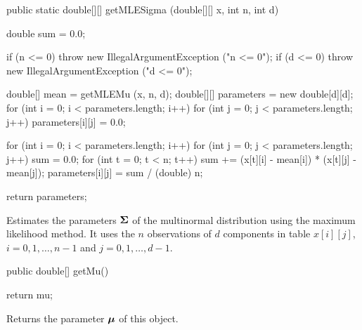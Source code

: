 \begin{htmlonly}
\end{htmlonly}
\begin{code}

   public static double[][] getMLESigma (double[][] x, int n, int d)\begin{hide} {
      double sum = 0.0;

      if (n <= 0)
         throw new IllegalArgumentException ("n <= 0");
      if (d <= 0)
         throw new IllegalArgumentException ("d <= 0");

      double[] mean = getMLEMu (x, n, d);
      double[][] parameters = new double[d][d];
      for (int i = 0; i < parameters.length; i++)
         for (int j = 0; j < parameters.length; j++)
            parameters[i][j] = 0.0;

      for (int i = 0; i < parameters.length; i++)
      {
         for (int j = 0; j < parameters.length; j++)
         {
            sum = 0.0;
            for (int t = 0; t < n; t++)
               sum += (x[t][i] - mean[i]) * (x[t][j] - mean[j]);
            parameters[i][j] = sum / (double) n;
         }
      }

      return parameters;
   }\end{hide}
\end{code}
\begin{tabb}
   Estimates the parameters $\boldsymbol{\Sigma}$ of the multinormal distribution using
   the maximum likelihood method. It uses the $n$ observations of $d$
   components in table $x[i][j]$, $i = 0, 1, \ldots, n-1$ and
   $j = 0, 1, \ldots, d-1$.
\end{tabb}
\begin{htmlonly}
\end{htmlonly}
\begin{code}

   public double[] getMu()\begin{hide} {
      return mu;
   }\end{hide}
\end{code}
\begin{tabb}
   Returns the parameter $\boldsymbol{\mu}$ of this object.
\end{tabb}
